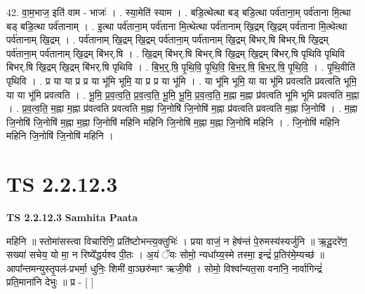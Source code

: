 \documentclass[17pt]{extarticle}
\begin{document}
42. वा॒म॒भाज॒ इति॑ वाम - भाजः॑ । . स्या॒मेति॑ स्याम । . बडि॒त्थेत्था बड् बडि॒त्था पर्व॑ताना॒म् पर्व॑ताना मि॒त्था बड् बडि॒त्था पर्व॑तानाम् । . इ॒त्था पर्व॑ताना॒म् पर्व॑ताना मि॒त्थेत्था पर्व॑तानाम् खि॒द्रम् खि॒द्रम् पर्व॑ताना मि॒त्थेत्था पर्व॑तानाम् खि॒द्रम् । . पर्व॑तानाम् खि॒द्रम् खि॒द्रम् पर्व॑ताना॒म् पर्व॑तानाम् खि॒द्रम् बि॑भर्.षि बिभर्.षि खि॒द्रम् पर्व॑ताना॒म् पर्व॑तानाम् खि॒द्रम् बि॑भर्.षि । . खि॒द्रम् बि॑भर्.षि बिभर्.षि खि॒द्रम् खि॒द्रम् बि॑भर्.षि पृथिवि पृथिवि बिभर्.षि खि॒द्रम् खि॒द्रम् बि॑भर्.षि पृथिवि । . बि॒भ॒र्॒.षि॒ पृ॒थि॒वि॒ पृ॒थि॒वि॒ बि॒भ॒र्॒.षि॒ बि॒भ॒र्॒.षि॒ पृ॒थि॒वि॒ । . पृ॒थि॒वीति॑ पृथिवि । . प्र या या प्र प्र या भू॑मि भूमि॒ या प्र प्र या भू॑मि । . या भू॑मि भूमि॒ या या भू॑मि प्रवत्वति प्रवत्वति भूमि॒ या या भू॑मि प्रवत्वति । . भू॒मि॒ प्र॒व॒त्व॒ति॒ प्र॒व॒त्व॒ति॒ भू॒मि॒ भू॒मि॒ प्र॒व॒त्व॒ति॒ म॒ह्ना म॒ह्ना प्र॑वत्वति भूमि भूमि प्रवत्वति म॒ह्ना । . प्र॒व॒त्व॒ति॒ म॒ह्ना म॒ह्ना प्र॑वत्वति प्रवत्वति म॒ह्ना जि॒नोषि॑ जि॒नोषि॑ म॒ह्ना प्र॑वत्वति प्रवत्वति म॒ह्ना जि॒नोषि॑ । . म॒ह्ना जि॒नोषि॑ जि॒नोषि॑ म॒ह्ना म॒ह्ना जि॒नोषि॑ महिनि महिनि जि॒नोषि॑ म॒ह्ना म॒ह्ना जि॒नोषि॑ महिनि । . जि॒नोषि॑ महिनि महिनि जि॒नोषि॑ जि॒नोषि॑ महिनि । \newline
\pagebreak
{}

\section{ TS 2.2.12.3 }

\textbf{TS 2.2.12.3 } \newline
\textbf{Samhita Paata} \newline

महिनि ॥ स्तोमा॑सस्त्वा विचारिणि॒ प्रति॑ष्टोभन्त्य॒क्तुभिः॑ । प्रया वाजं॒ न हेष॑न्तं पे॒रुमस्य॑स्यर्जुनि ॥ ऋ॒दू॒दरे॑ण॒ सख्या॑ सचेय॒ यो मा॒ न रिष्ये᳚द्धर्यश्व पी॒तः । अ॒यं ॅयः सोमो॒ न्यधा᳚य्य॒स्मे तस्मा॒ इन्द्रं॑ प्र॒तिर॑मे॒म्यच्छ॑ ॥ आपा᳚न्तमन्युस्तृ॒पल॑-प्रभर्मा॒ धुनिः॒ शिमी॑ वा॒ञ्छरु॑माꣳ ऋजी॒षी । सोमो॒ विश्वा᳚न्यत॒सा वना॑नि॒ नार्वागिन्द्रं॑ प्रति॒माना॑नि देभुः ॥ प्र - [  ] \newline
\end{document}
